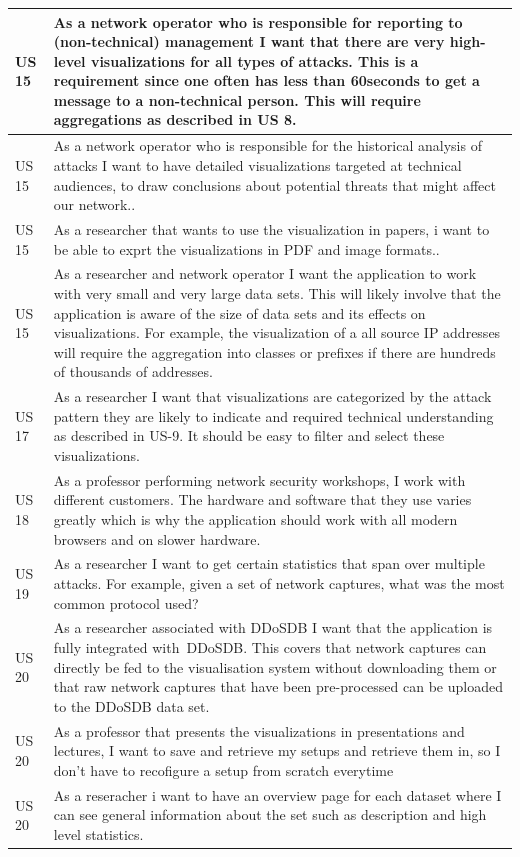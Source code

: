 \begin{table}[]
\begin{tabular}{|p{1.1cm}|p{12cm}|}
US 15       & As a network operator who is responsible for reporting to (non-technical) management I want that there are very high-level visualizations for all types of attacks. This is a requirement since one often has less than 60seconds to get a message to a non-technical person\cite{appliedsecurityvisualizations}. This will require aggregations as described in US 8.\\ \hline
US 15       & As a network operator who is responsible for the historical analysis of attacks I want to have detailed visualizations targeted at technical audiences, to draw conclusions about potential threats that might affect our network.\cite{appliedsecurityvisualizations}.\\ \hline
US 15       & As a researcher that  wants to use the visualization in papers, i want to be able to exprt the visualizations in PDF and image formats.\cite{appliedsecurityvisualizations}.\\ \hline
US 15       & As a researcher and network operator I want the application to work with very small and very large data sets. This will likely involve that the application is aware of the size of data sets and its effects on visualizations\cite{appliedsecurityvisualizations}. For example, the visualization of a all source IP addresses will require the aggregation into classes or prefixes if there are hundreds of thousands of addresses.\\ \hline
US 17       & As a researcher I want that visualizations are categorized by the attack pattern they are likely to indicate and required technical understanding as described in US-9. It should be easy to filter and select these visualizations.\\ \hline
US 18       & As a professor performing network security workshops, I work with different customers. The hardware and software that they use varies greatly which is why the application should work with all modern browsers and on slower hardware.\\ \hline
US 19       & As a researcher I want to get certain statistics that span over multiple attacks. For example, given a set of network captures, what was the most common protocol used?\\ \hline
US 20      & As a researcher associated with DDoSDB I want that the application is fully integrated with DDoSDB. This covers that network captures can directly be fed to the visualisation system without downloading them or that raw network captures that have been pre-processed can be uploaded to the DDoSDB data set.\\ \hline
US 20      & As a professor that presents the visualizations in presentations and lectures, I want to save and retrieve my setups and retrieve them in, so I don't have to recofigure a setup from scratch everytime\\ \hline
US 20      & As a reseracher i want to have an overview page for each dataset where I can see general information about the set such as description and high level statistics.\\ \hline


\end{tabular}
\end{table}
